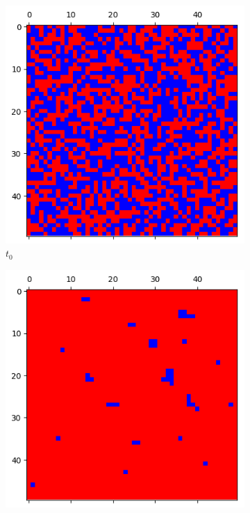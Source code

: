 \documentclass[letterpaper]{article}
\begin{document}

\begin{figure}
    \begin{subfigure}{.33\textwidth}
      \centering
      \includegraphics[width=1\linewidth]{images/assign2/visu_50-part1/t0}
      \caption{$t_0$}
      \label{fig:t0_50part1}
    \end{subfigure}
    \begin{subfigure}{.33\textwidth}
      \centering
      \includegraphics[width=1\linewidth]{images/assign2/visu_50-part1/t1}

\end{subfigure}
\end{figure}
\end{document}
